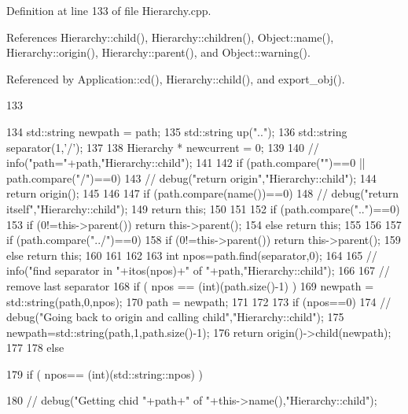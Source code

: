 Definition at line 133 of file Hierarchy.cpp.

References Hierarchy::child(), Hierarchy::children(), Object::name(), Hierarchy::origin(), Hierarchy::parent(), and Object::warning().

Referenced by Application::cd(), Hierarchy::child(), and export\_\-obj().


\begin{DoxyCode}
133                                          {
134   std::string newpath = path;
135   std::string up("..");
136   std::string separator(1,'/');
137 
138   Hierarchy * newcurrent = 0;
139 
140   //  info("path="+path,"Hierarchy::child");
141 
142   if (path.compare("")==0 || path.compare("/")==0) {
143     //    debug("return origin","Hierarchy::child");
144     return origin();
145   }
146 
147   if (path.compare(name())==0){
148     //    debug("return itself","Hierarchy::child");
149     return this;
150   }
151 
152   if (path.compare("..")==0){
153     if (0!=this->parent()) return this->parent();
154     else return this;
155   }
156 
157   if (path.compare("../")==0){
158     if (0!=this->parent()) return this->parent();
159     else return this;
160   }
161 
162 
163   int npos=path.find(separator,0);
164 
165   //  info("find separator in "+itos(npos)+" of "+path,"Hierarchy::child");
166 
167   // remove last separator
168   if ( npos == (int)(path.size()-1) ) {
169     newpath = std::string(path,0,npos);
170     path = newpath;
171   }
172 
173   if (npos==0){
174     //    debug("Going back to origin and calling child","Hierarchy::child");
175     newpath=std::string(path,1,path.size()-1);
176     return origin()->child(newpath);
177   }
178   else{
179     if ( npos== (int)(std::string::npos) ){
180       //      debug("Getting chid "+path+" of "+this->name(),"Hierarchy::child");
      
}}}
\end{DoxyCode}
